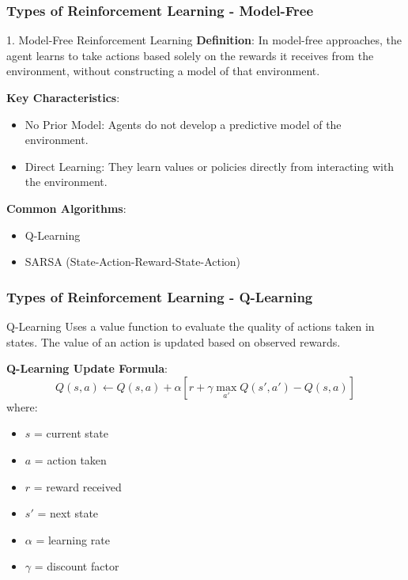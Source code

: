 \documentclass[aspectratio=169]{beamer}
\begin{document}
\begin{frame}[fragile]
    \frametitle{Types of Reinforcement Learning - Model-Free}
    \begin{block}{1. Model-Free Reinforcement Learning}
        \textbf{Definition}: In model-free approaches, the agent learns to take actions based solely on the rewards it receives from the environment, without constructing a model of that environment.

        \textbf{Key Characteristics}:
        \begin{itemize}
            \item No Prior Model: Agents do not develop a predictive model of the environment.
            \item Direct Learning: They learn values or policies directly from interacting with the environment.
        \end{itemize}

        \textbf{Common Algorithms}:
        \begin{itemize}
            \item Q-Learning
            \item SARSA (State-Action-Reward-State-Action)
        \end{itemize}
    \end{block}
\end{frame}

\begin{frame}[fragile]
    \frametitle{Types of Reinforcement Learning - Q-Learning}
    \begin{block}{Q-Learning}
        Uses a value function to evaluate the quality of actions taken in states. The value of an action is updated based on observed rewards.

        \textbf{Q-Learning Update Formula}:
        \begin{equation}
        Q(s, a) \leftarrow Q(s, a) + \alpha \left[ r + \gamma \max_{a'} Q(s', a') - Q(s, a) \right]
        \end{equation}
        where:
        \begin{itemize}
            \item $s$ = current state
            \item $a$ = action taken
            \item $r$ = reward received
            \item $s'$ = next state
            \item $\alpha$ = learning rate
            \item $\gamma$ = discount factor
        \end{itemize}
    \end{block}
\end{frame}
\end{document}
